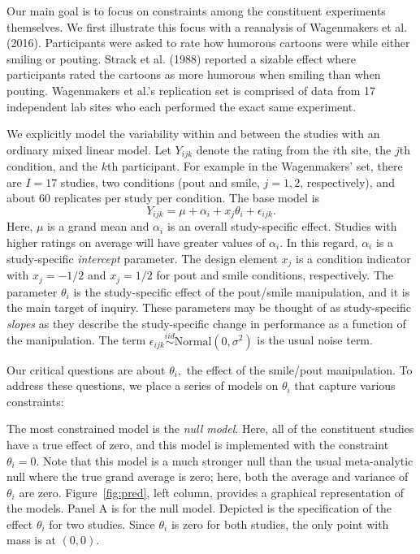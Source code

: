 \documentclass[english,man]{apa6}
\theoremstyle{definition}
\theoremstyle{definition}
\theoremstyle{definition}
\theoremstyle{remark}
\begin{document}
Our main goal is to focus on constraints among the constituent
experiments themselves. We first illustrate this focus with a reanalysis
of Wagenmakers et al. (2016). Participants were asked to rate how
humorous cartoons were while either smiling or pouting. Strack et al.
(1988) reported a sizable effect where participants rated the cartoons
as more humorous when smiling than when pouting. Wagenmakers et al.'s
replication set is comprised of data from 17 independent lab sites who
each performed the exact same experiment.

We explicitly model the variability within and between the studies with
an ordinary mixed linear model. Let \(Y_{ijk}\) denote the rating from
the \(i\)th site, the \(j\)th condition, and the \(k\)th participant.
For example in the Wagenmakers' set, there are \(I=17\) studies, two
conditions (pout and smile, \(j=1,2\), respectively), and about 60
replicates per study per condition. The base model is \[
Y_{ijk} = \mu+\alpha_i + x_j\theta_i+\epsilon_{ijk}.
\] Here, \(\mu\) is a grand mean and \(\alpha_i\) is an overall
study-specific effect. Studies with higher ratings on average will have
greater values of \(\alpha_i\). In this regard, \(\alpha_i\) is a
study-specific \emph{intercept} parameter. The design element \(x_j\) is
a condition indicator with \(x_j=-1/2\) and \(x_j=1/2\) for pout and
smile conditions, respectively. The parameter \(\theta_i\) is the
study-specific effect of the pout/smile manipulation, and it is the main
target of inquiry. These parameters may be thought of as study-specific
\emph{slopes} as they describe the study-specific change in performance
as a function of the manipulation. The term
\(\epsilon_{ijk}\stackrel{iid}{\sim}\mbox{Normal}(0,\sigma^2)\) is the
usual noise term.

Our critical questions are about \(\theta_i,\) the effect of the
smile/pout manipulation. To address these questions, we place a series
of models on \(\theta_i\) that capture various constraints:

The most constrained model is the \emph{null model}. Here, all of the
constituent studies have a true effect of zero, and this model is
implemented with the constraint \(\theta_i=0\). Note that this model is
a much stronger null than the usual meta-analytic null where the true
grand average is zero; here, both the average and variance of
\(\theta_i\) are zero. Figure~\ref{fig:pred}, left column, provides a
graphical representation of the models. Panel A is for the null model.
Depicted is the specification of the effect \(\theta_i\) for two
studies. Since \(\theta_i\) is zero for both studies, the only point
with mass is at \((0,0)\).
\end{document}
